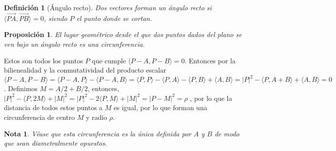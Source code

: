 \documentclass[11pt, a4paper]{article}
\makeatletter
\newif\IfInSansMode
\let\oldsf\sffamily
\renewcommand*{\sffamily}{\oldsf\mathversion{sans}\InSansModetrue}
\let\oldnorm\normalfont
\renewcommand*{\normalfont}{\oldnorm\InSansModefalse\mathversion{normal}}
\renewenvironment{proof}[1][\proofname] {\vspace{-15pt}\par\pushQED{\qed}\normalfont\topsep6\p@\@plus6\p@\relax\trivlist\item[\hskip\labelsep\it#1\@addpunct{.}]\ignorespaces}{\popQED\endtrivlist\@endpefalse}
\renewcommand{\vec}{\overrightarrow}
\renewenvironment{proof}[1][\proofname] {\par\pushQED{\qed}\normalfont\topsep6\p@\@plus6\p@\relax\trivlist\item[\hskip\labelsep\itshape\sffamily#1\@addpunct{.}]\ignorespaces}{\popQED\endtrivlist\@endpefalse}
\theoremstyle{theorem-style}
\newtheorem{nprop}{Proposición}[section]
\theoremstyle{definition-style}
\newtheorem{ndef}{Definición}[section]
\theoremstyle{remark-style}
\newtheorem*{nota}{Nota}
\theoremstyle{example-style}
\makeatother
\begin{document}
\begin{ndef}[Ángulo recto]
  Dos vectores forman un ángulo recto si $\langle \vec{PA},\vec{PB}\rangle  = 0$, siendo $P$ el punto donde se cortan.
\end{ndef}

\begin{nprop}
  El lugar geométrico desde el que dos puntos dados del plano se ven bajo un ángulo recto es una circunferencia.
\end{nprop}

\begin{proof}
	Estos son todos los puntos $P$ que cumple $\langle P-A, P-B\rangle =0$. Entonces por la bilienealidad y la conmutatividad del producto escalar $\langle P-A,P-B\rangle  = \langle P-A,P\rangle  - \langle  P-A,B\rangle  = \langle P,P\rangle  - \langle P,A\rangle  - \langle P,B\rangle  + \langle A,B\rangle  = | P|^2 - \langle P,A+B\rangle  + \langle A,B\rangle  = 0  $. Definimos $M=A/2+B/2 $, entonces, %
	$|P|^2 - \langle P,2M\rangle  + |M|^2 = |P|^2 - 2\langle P,M\rangle  + |M|^2 = |P-M|^2 = \rho$ ,  por lo que la distancia de todos estos puntos a $M$ es igual, por lo que forman una circunferencia de centro $M$ y radio $\rho$. 
\end{proof}

\begin{nota}
	Véase que esta circunferencia es la única definida por $A$ y $B$ de modo que sean diametralmente opuestos.
\end{nota}
\end{document}
